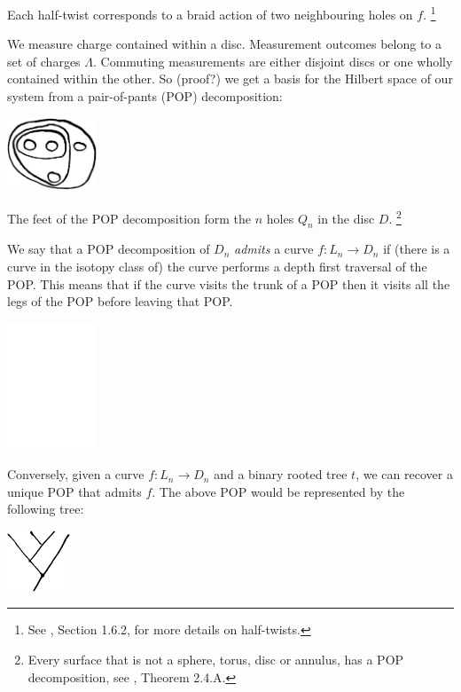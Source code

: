 \documentclass[12pt,a4paper]{article}
\begin{document}
Each half-twist corresponds to a braid action of two neighbouring
holes on $f$.
\footnote{See \cite{Kassel10}, Section 1.6.2, for more details on half-twists.}




We measure charge contained within a disc. %
Measurement outcomes belong to a set of charges $\Lambda.$
Commuting measurements are either disjoint discs or
one wholly contained within the other.
So (proof?) we get a basis for the Hilbert space of our system from
a pair-of-pants (POP) decomposition:

\begin{center}
\includegraphics[width=0.2\textwidth]{POP-1.eps}
\end{center}

The feet of the POP decomposition form the $n$ holes $Q_n$ in the disc $D$.
\footnote{Every surface that is not a sphere, torus, disc or annulus, has
a POP decomposition, see \cite{Ivanov01}, Theorem 2.4.A.}

We say that a POP decomposition of $D_n$
{\it admits} a curve $f:L_n\to D_n$
if (there is a curve in the isotopy class of)
the curve performs a depth first traversal of the POP.
This means that if the curve visits the trunk of a POP
then it visits all the legs of the POP before leaving that POP.

\begin{center}
\includegraphics[width=0.2\textwidth]{POP-2.eps}
\end{center}

Conversely, given a curve $f:L_n\to D_n$
and a binary rooted tree $t$,
we can recover a unique POP that admits $f$.
The above POP would be represented by the following tree:

\begin{center}
\includegraphics[width=0.14\textwidth]{POP-3.eps}
\end{center}
\end{document}
